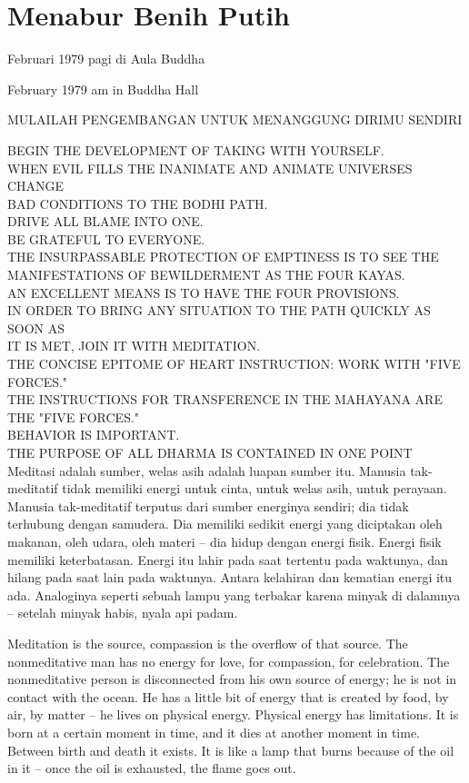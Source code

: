 \chapter{Menabur Benih Putih} %

 Februari 1979 pagi di Aula Buddha

 February 1979 am in Buddha Hall

\bahasa
MULAILAH PENGEMBANGAN UNTUK MENANGGUNG DIRIMU SENDIRI

\english
BEGIN THE DEVELOPMENT OF TAKING WITH YOURSELF. \\
WHEN EVIL FILLS THE INANIMATE AND ANIMATE UNIVERSES CHANGE \\
BAD CONDITIONS TO THE BODHI PATH. \\
DRIVE ALL BLAME INTO ONE. \\
BE GRATEFUL TO EVERYONE. \\
THE INSURPASSABLE PROTECTION OF EMPTINESS IS TO SEE THE \\
MANIFESTATIONS OF BEWILDERMENT AS THE FOUR KAYAS. \\
AN EXCELLENT MEANS IS TO HAVE THE FOUR PROVISIONS. \\
IN ORDER TO BRING ANY SITUATION TO THE PATH QUICKLY AS SOON AS \\
IT IS MET, JOIN IT WITH MEDITATION. \\
THE CONCISE EPITOME OF HEART INSTRUCTION: WORK WITH "FIVE FORCES." \\
THE INSTRUCTIONS FOR TRANSFERENCE IN THE MAHAYANA ARE THE "FIVE FORCES." \\
BEHAVIOR IS IMPORTANT. \\
THE PURPOSE OF ALL DHARMA IS CONTAINED IN ONE POINT \\

\bahasa
Meditasi adalah sumber, welas asih adalah luapan sumber itu. Manusia tak-meditatif tidak memiliki energi untuk cinta, untuk welas asih, untuk perayaan. Manusia tak-meditatif terputus dari sumber energinya sendiri; dia tidak terhubung dengan samudera. Dia memiliki sedikit energi yang diciptakan oleh makanan, oleh udara, oleh materi -- dia hidup dengan energi fisik. Energi fisik memiliki keterbatasan. Energi itu lahir pada saat tertentu pada waktunya, dan hilang pada saat lain pada waktunya. Antara kelahiran dan kematian energi itu ada. Analoginya seperti sebuah lampu yang terbakar karena minyak di dalamnya -- setelah minyak habis, nyala api padam.

\english
Meditation is the source, compassion is the overflow of that source. The nonmeditative man has no energy for love, for compassion, for celebration. The nonmeditative person is disconnected from his own source of energy; he is not in contact with the ocean. He has a little bit of energy that is created by food, by air, by matter -- he lives on physical energy. Physical energy has limitations. It is born at a certain moment in time, and it dies at another moment in time. Between birth and death it exists. It is like a lamp that burns because of the oil in it -- once the oil is exhausted, the flame goes out.

\bahasa

\english

